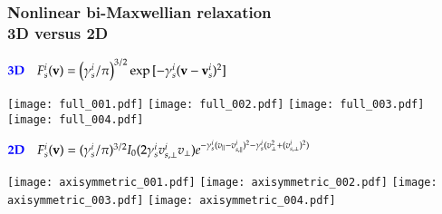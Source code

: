 \begin{frame}
  \frametitle{Nonlinear bi-Maxwellian relaxation\\
    \textcolor{egg}{\large 3D versus 2D}}
  $\textcolor{blue}{\bf 3D}\quad F_s^i(\mathbf{v})=\left(\gamma_s^i/\pi\right)^{3/2}
  \exp{[-\gamma_s^i(\mathbf{v}-\mathbf{v}_s^i)^2]}$
\vspace{-1mm}
  \begin{center}
  \texttt{[image: full\_001.pdf]}
  \texttt{[image: full\_002.pdf]}
  \texttt{[image: full\_003.pdf]}
  \texttt{[image: full\_004.pdf]}
\end{center}
\vskip -2mm
$\textcolor{blue}{\bf 2D}\quad F_s^i(\mathbf{v})=(\gamma_s^i/\pi)^{3/2}
I_0(2\gamma_s^iv_{s,\perp}^iv_{\perp})
e^{-\gamma_s^i(v_{\parallel}-v_{s,\parallel}^i)^2-\gamma_s^i(v_{\perp}^2+(v_{s,\perp}^i)^2)}$
\vspace{-1mm}
\begin{center}
  \texttt{[image: axisymmetric\_001.pdf]}
  \texttt{[image: axisymmetric\_002.pdf]}
  \texttt{[image: axisymmetric\_003.pdf]}
  \texttt{[image: axisymmetric\_004.pdf]}
\end{center}
\end{frame}
